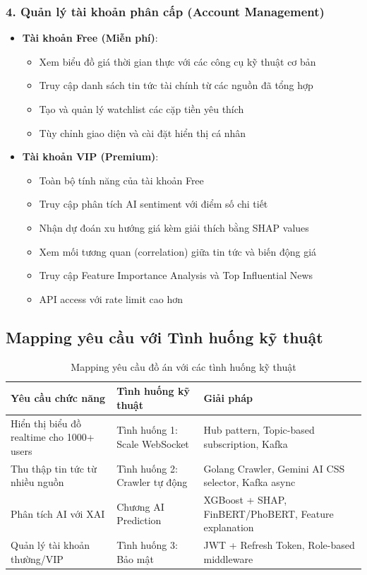 \subsubsection*{4. Quản lý tài khoản phân cấp (Account Management)}
\begin{itemize}
    \item \textbf{Tài khoản Free (Miễn phí)}:
    \begin{itemize}
        \item Xem biểu đồ giá thời gian thực với các công cụ kỹ thuật cơ bản
        \item Truy cập danh sách tin tức tài chính từ các nguồn đã tổng hợp
        \item Tạo và quản lý watchlist các cặp tiền yêu thích
        \item Tùy chỉnh giao diện và cài đặt hiển thị cá nhân
    \end{itemize}
    
    \item \textbf{Tài khoản VIP (Premium)}:
    \begin{itemize}
        \item Toàn bộ tính năng của tài khoản Free
        \item Truy cập phân tích AI sentiment với điểm số chi tiết
        \item Nhận dự đoán xu hướng giá kèm giải thích bằng SHAP values
        \item Xem mối tương quan (correlation) giữa tin tức và biến động giá
        \item Truy cập Feature Importance Analysis và Top Influential News
        \item API access với rate limit cao hơn
    \end{itemize}
\end{itemize}

\subsection*{Mapping yêu cầu với Tình huống kỹ thuật}

\begin{table}[H]
\centering
\caption{Mapping yêu cầu đồ án với các tình huống kỹ thuật}
\begin{tabular}{|p{4cm}|p{4cm}|p{5cm}|}
\hline
\textbf{Yêu cầu chức năng} & \textbf{Tình huống kỹ thuật} & \textbf{Giải pháp} \\
\hline
Hiển thị biểu đồ realtime cho 1000+ users & Tình huống 1: Scale WebSocket & Hub pattern, Topic-based subscription, Kafka \\
\hline
Thu thập tin tức từ nhiều nguồn & Tình huống 2: Crawler tự động & Golang Crawler, Gemini AI CSS selector, Kafka async \\
\hline
Phân tích AI với XAI & Chương AI Prediction & XGBoost + SHAP, FinBERT/PhoBERT, Feature explanation \\
\hline
Quản lý tài khoản thường/VIP & Tình huống 3: Bảo mật & JWT + Refresh Token, Role-based middleware \\
\hline
\end{tabular}
\end{table}


